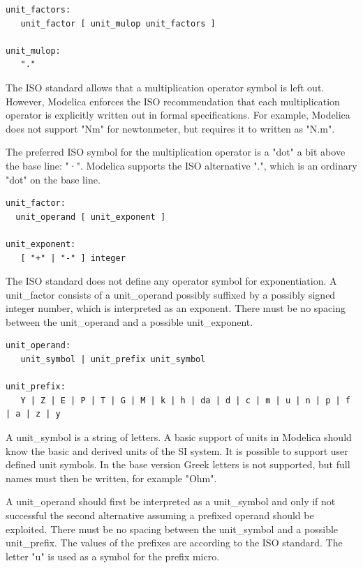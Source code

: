 \documentclass[10pt,a4paper]{report}
\begin{document}
\begin{lstlisting}[language=grammar]
unit_factors:
   unit_factor [ unit_mulop unit_factors ]

unit_mulop:
   "."
\end{lstlisting}

The ISO standard allows that a multiplication operator symbol is left
out. However, Modelica enforces the ISO recommendation that each
multiplication operator is explicitly written out in formal
specifications. For example, Modelica does not support "Nm" for
newtonmeter, but requires it to written as "N.m".

The preferred ISO symbol for the multiplication operator is a "dot" a
bit above the base line: "·". Modelica supports the ISO alternative ".",
which is an ordinary "dot" on the base line.

\begin{lstlisting}[language=grammar]
unit_factor:
  unit_operand [ unit_exponent ]

unit_exponent:
   [ "+" | "-" ] integer
\end{lstlisting}

The ISO standard does not define any operator symbol for exponentiation.
A unit\_factor consists of a unit\_operand possibly suffixed by a
possibly signed integer number, which is interpreted as an exponent.
There must be no spacing between the unit\_operand and a possible
unit\_exponent.

\begin{lstlisting}[language=grammar]
unit_operand:
   unit_symbol | unit_prefix unit_symbol

unit_prefix:
   Y | Z | E | P | T | G | M | k | h | da | d | c | m | u | n | p | f | a | z | y
\end{lstlisting}

A unit\_symbol is a string of letters. A basic support of units in
Modelica should know the basic and derived units of the SI system. It is
possible to support user defined unit symbols. In the base version Greek
letters is not supported, but full names must then be written, for
example "Ohm".

A unit\_operand should first be interpreted as a unit\_symbol and only
if not successful the second alternative assuming a prefixed operand
should be exploited. There must be no spacing between the unit\_symbol
and a possible unit\_prefix. The values of the prefixes are according to
the ISO standard. The letter "u" is used as a symbol for the prefix
micro.
\end{document}
